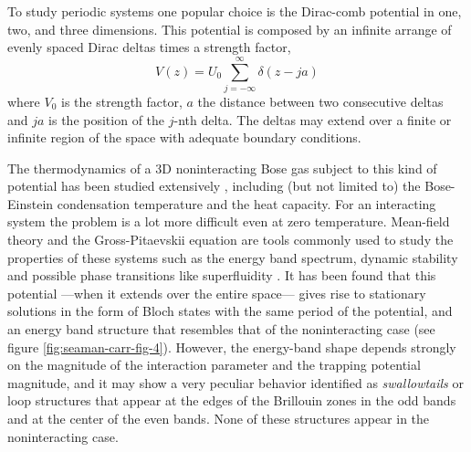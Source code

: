 To study periodic systems one popular choice is the Dirac-comb potential in one,
two, and three dimensions. This potential is composed by an infinite arrange of
evenly spaced Dirac deltas times a strength factor,
%
\begin{equation}
	\label{eq:dirac-comb-potential}
	V(z) = U_0 \sum_{j=-\infty}^{\infty} \delta(z - j a)
\end{equation}
%
where $V_0$ is the strength factor, $a$ the distance between two consecutive
deltas and $j a$ is the position of the $j$-nth delta. The deltas may extend
over a finite or infinite region of the space with adequate boundary conditions.

The thermodynamics of a 3D noninteracting Bose gas subject to this kind of
potential has been studied extensively
\cite{bib:p-salas-phys-rev-A.82.033632.2010,
	bib:salas-j-low-temp-phys.159.5.2010}, including (but not limited to) the
Bose-Einstein condensation temperature and the heat capacity. For an interacting
system the problem is a lot more difficult even at zero temperature. Mean-field
theory and the Gross-Pitaevskii equation are tools commonly used to study the
properties of these systems such as the energy band spectrum, dynamic stability
and possible phase transitions like superfluidity
\cite{bib:seaman-phys-rev-A.71.033622.2005, bib:dong-laser-physics.17.2.2007}.
It has been found that this potential ---when it extends over the entire
space--- gives rise to stationary solutions in the form of Bloch states with the
same period of the potential, and an energy band structure that resembles that
of the noninteracting case (see figure \ref{fig:seaman-carr-fig-4}). However,
the energy-band shape depends strongly on the magnitude of the interaction
parameter and the trapping potential magnitude, and it may show a very peculiar
behavior identified as \textit{swallowtails} or loop structures that appear at
the edges of the Brillouin zones in the odd bands and at the center of the even
bands. None of these structures appear in the noninteracting case.

